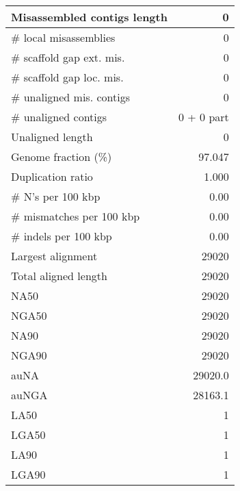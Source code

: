 \documentclass[12pt,a4paper]{article}
\begin{document}
\begin{table}[ht]
\begin{center}
\begin{tabular}{|l*{1}{|r}|}
Misassembled contigs length & 0 \\ \hline
\# local misassemblies & 0 \\ \hline
\# scaffold gap ext. mis. & 0 \\ \hline
\# scaffold gap loc. mis. & 0 \\ \hline
\# unaligned mis. contigs & 0 \\ \hline
\# unaligned contigs & 0 + 0 part \\ \hline
Unaligned length & 0 \\ \hline
Genome fraction (\%) & 97.047 \\ \hline
Duplication ratio & 1.000 \\ \hline
\# N's per 100 kbp & 0.00 \\ \hline
\# mismatches per 100 kbp & 0.00 \\ \hline
\# indels per 100 kbp & 0.00 \\ \hline
Largest alignment & 29020 \\ \hline
Total aligned length & 29020 \\ \hline
NA50 & 29020 \\ \hline
NGA50 & 29020 \\ \hline
NA90 & 29020 \\ \hline
NGA90 & 29020 \\ \hline
auNA & 29020.0 \\ \hline
auNGA & 28163.1 \\ \hline
LA50 & 1 \\ \hline
LGA50 & 1 \\ \hline
LA90 & 1 \\ \hline
LGA90 & 1 \\ \hline
\end{tabular}
\end{center}
\end{table}
\end{document}
